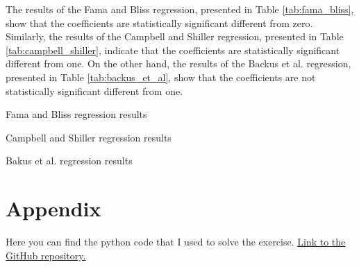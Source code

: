\documentclass[hidelinks,12pt]{article}
\begin{document}
The results of the Fama and Bliss regression, presented in Table \ref{tab:fama_bliss}, show that the coefficients are statistically significant different from zero.
Similarly, the results of the Campbell and Shiller regression, presented in Table \ref{tab:campbell_shiller}, indicate that the coefficients are statistically significant different from one. 
On the other hand, the results of the Backus et al. regression, presented in Table \ref{tab:backus_et_al}, show that the coefficients are not statistically significant different from one. 


\begin{table}[htbp]
\centering
\caption{Fama and Bliss regression results}
\label{tab:fama_bliss}
\resizebox{!}{!}{}
\end{table}


\begin{table}[htbp]
    \centering
    \caption{Campbell and Shiller regression results}
    \label{tab:campbell_shiller}
    \resizebox{!}{!}{}
    \end{table}



\begin{table}[htbp]
    \centering
    \caption{Bakus et al. regression results}
    \label{tab:backus_et_al}
    \resizebox{!}{!}{}
    \end{table}


\appendix

\section*{Appendix}

Here you can find the python code that I used to solve the exercise. \href{https://github.com/mortezaaghajanzadeh/EAP/tree/main/Assignment3}{Link to the GitHub repository.}
\end{document}
